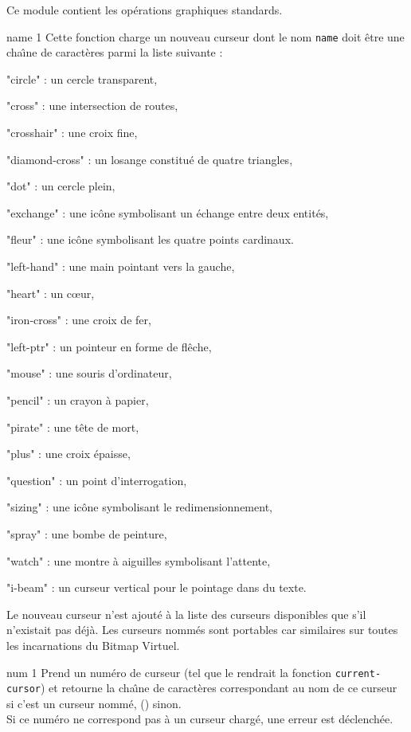 
Ce module contient les op\'{e}rations graphiques standards.


 {name} {1}
Cette fonction charge un nouveau curseur dont le nom {\tt name} doit \^{e}tre
une cha\^{\i}ne de caract\`{e}res parmi la liste suivante :
\begin {Itemize}
\item "circle" : un cercle transparent,
\item "cross" : une intersection de routes,
\item "crosshair" : une croix fine,
\item "diamond-cross" : un losange constitu\'{e} de quatre triangles,
\item "dot" : un cercle plein,
\item "exchange" : une ic\^{o}ne symbolisant un \'{e}change entre deux entit\'{e}s,
\item "fleur" : une ic\^{o}ne symbolisant les quatre points cardinaux.
\item "left-hand" : une main pointant vers la gauche,
\item "heart" : un c\oe ur,
\item "iron-cross" : une croix de fer,
\item "left-ptr" : un pointeur en forme de fl\^{e}che,
\item "mouse" : une souris d'ordinateur,
\item "pencil" : un crayon \`{a} papier,
\item "pirate" : une t\^{e}te de mort,
\item "plus" : une croix \'{e}paisse,
\item "question" : un point d'interrogation,
\item "sizing" : une ic\^{o}ne symbolisant le redimensionnement,
\item "spray" : une bombe de peinture,
\item "watch" : une montre \`{a} aiguilles symbolisant l'attente,
\item "i-beam" : un curseur vertical pour le pointage dans du texte.
\end {Itemize}
Le nouveau curseur n'est ajout\'{e} \`{a} la liste des curseurs disponibles que s'il
n'existait pas d\'{e}j\`{a}.
Les curseurs nomm\'{e}s sont portables car similaires sur toutes les
incarnations du Bitmap Virtuel.


 {num} {1}
Prend un num\'{e}ro de curseur (tel que le rendrait la fonction
{\tt current-cursor}) et retourne la cha\^{\i}ne de caract\`{e}res correspondant au
nom de ce curseur si c'est un curseur nomm\'{e}, () sinon.\\
Si ce num\'{e}ro ne correspond pas \`{a} un curseur charg\'{e}, une erreur est
d\'{e}clench\'{e}e.


